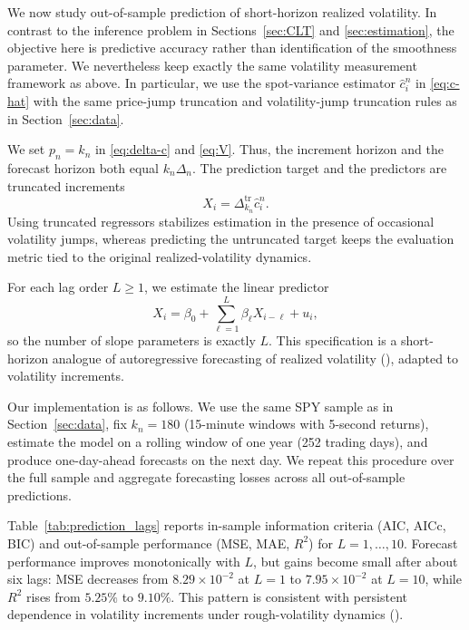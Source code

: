 \documentclass[ecta,nameyear,draft]{econsocart}
\def\wh{\widehat}
\newcommand{\1}{\mathbf 1}
\newcommand{\tr}{\mathrm{tr}}
\numberwithin{equation}{section}
\begin{document}
We now study out-of-sample prediction of short-horizon realized volatility. In contrast to the inference problem in Sections~\ref{sec:CLT} and \ref{sec:estimation}, the objective here is predictive accuracy rather than identification of the smoothness parameter. We nevertheless keep exactly the same volatility measurement framework as above. In particular, we use the spot-variance estimator $\wh c_i^n$ in \eqref{eq:c-hat} with the same price-jump truncation and volatility-jump truncation rules as in Section~\ref{sec:data}. 

We set $p_n=k_n$ in \eqref{eq:delta-c} and \eqref{eq:V}. Thus, the increment horizon and the forecast horizon both equal $k_n\Delta_n$. The prediction target and the predictors are truncated increments
\[
X_i=\Delta_{k_n}^{\tr}\wh c_i^n.
\]
Using truncated regressors stabilizes estimation in the presence of occasional volatility jumps, whereas predicting the untruncated target keeps the evaluation metric tied to the original realized-volatility dynamics.

For each lag order $L\geq1$, we estimate the linear predictor
\[
X_i=\beta_0+\sum_{\ell=1}^{L}\beta_{\ell}X_{i-\ell}+u_i,
\]
so the number of slope parameters is exactly $L$. This specification is a short-horizon analogue of autoregressive forecasting of realized volatility (\cite{ABDL03,Corsi09}), adapted to volatility increments.

Our implementation is as follows. We use the same SPY sample as in Section~\ref{sec:data}, fix $k_n=180$ (15-minute windows with 5-second returns), estimate the model on a rolling window of one year (252 trading days), and produce one-day-ahead forecasts on the next day. We repeat this procedure over the full sample and aggregate forecasting losses across all out-of-sample predictions.

Table~\ref{tab:prediction_lags} reports in-sample information criteria (AIC, AICc, BIC) and out-of-sample performance (MSE, MAE, $R^2$) for $L=1,\ldots,10$. Forecast performance improves monotonically with $L$, but gains become small after about six lags: MSE decreases from $8.29\times 10^{-2}$ at $L=1$ to $7.95\times 10^{-2}$ at $L=10$, while $R^2$ rises from $5.25\%$ to $9.10\%$. This pattern is consistent with persistent dependence in volatility increments under rough-volatility dynamics (\cite{gatheral2018volatility}).
\end{document}
